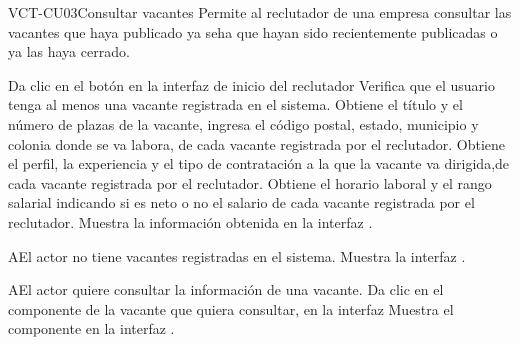 \clearpage
\begin{UseCase}[]{VCT-CU03}{Consultar vacantes}{
	Permite al reclutador de una empresa  consultar las vacantes que haya publicado ya seha que hayan sido recientemente publicadas 
	o ya las haya cerrado.
	}
\end{UseCase}

\begin{UCtrayectoria}
	\UCpaso [\UCactor] Da clic en el botón  en la interfaz de inicio del reclutador
	\UCpaso [\UCsist] Verifica que el usuario tenga al menos una vacante registrada en el sistema.
	\UCpaso [\UCsist] Obtiene el título y el número de plazas de la vacante, ingresa el código postal, estado, municipio y colonia donde 
	se va labora, de cada vacante registrada por el reclutador.
	\UCpaso [\UCsist] Obtiene el perfil, la experiencia y el tipo de contratación a la que la vacante va dirigida,de cada vacante registrada por el reclutador.
	\UCpaso [\UCsist] Obtiene el horario laboral y el rango salarial indicando si es neto o no el salario de cada vacante registrada por el reclutador.
	\UCpaso [\UCsist] Muestra la información obtenida en la interfaz . 
\end{UCtrayectoria}

\begin{UCtrayectoriaA}{A}{El actor no tiene vacantes registradas en el sistema.}
	\UCpaso [\UCsist] Muestra la interfaz .
\end{UCtrayectoriaA} 

\begin{UCtrayectoriaA}{A}{El actor quiere consultar la información de una vacante.}
	\UCpaso [\UCactor] Da clic en el componente  de la vacante que quiera consultar, en la interfaz  
	\UCpaso [\UCsist] Muestra el componente  en la interfaz .
\end{UCtrayectoriaA} 
